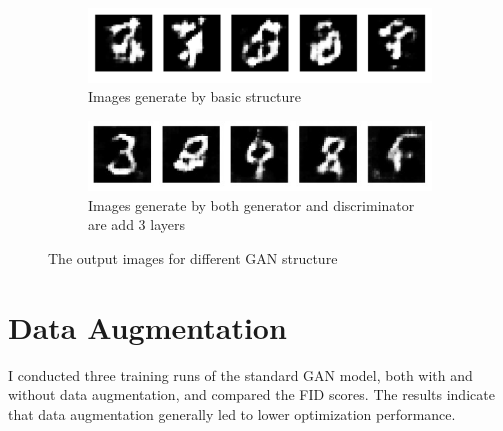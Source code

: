 \begin{figure}[H]
    \centering
    \begin{subfigure}[b]{\linewidth}
        \centering
        \includegraphics[width=0.7\linewidth]{./Images/generate_image_by_Convelution_layer.jpg}
        \caption{Images generate by basic structure}
        \label{fig:Dense}
    \end{subfigure}
    \vspace{0.05\linewidth} 
    \begin{subfigure}[b]{\linewidth}
        \centering
        \includegraphics[width=0.7\linewidth]{./Images/both_generator_and_discrimminator_are_add_3_layers.jpg}
        \caption{Images generate by both generator and discriminator are add 3 layers}
        \label{fig:Conv2DTranspose}
    \end{subfigure}
    \caption{The output images for different GAN structure}
    \label{fig:combined}
\end{figure}


\section*{Data Augmentation}

I conducted three training runs of the standard GAN model, both with and without data augmentation, 
and compared the FID scores. The results indicate that data augmentation generally led to lower optimization performance.


